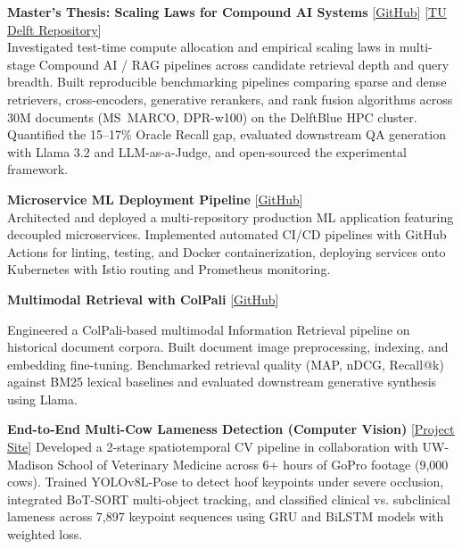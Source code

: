 \documentclass[letterpaper,11pt]{article}
\newcommand{\resumeItem}[1]{
  \item\normalsize{#1}
}
\begin{document}
\resumeItem{\textbf{Master's Thesis: Scaling Laws for Compound AI Systems} [\href{https://github.com/pratham2442000/MasterThesis}{\color{linkblue}\underline{GitHub}}] [\href{https://resolver.tudelft.nl/uuid:f0406b81-8b50-47c9-a44b-5da89c59c916}{\color{linkblue}\underline{TU Delft Repository}}]\\
  Investigated test-time compute allocation and empirical scaling laws in multi-stage Compound AI / RAG pipelines across candidate retrieval depth and query breadth. Built reproducible benchmarking pipelines comparing sparse and dense retrievers, cross-encoders, generative rerankers, and rank fusion algorithms across 30M documents (MS~MARCO, DPR-w100) on the DelftBlue HPC cluster. Quantified the 15--17\% Oracle Recall gap, evaluated downstream QA generation with Llama 3.2 and LLM-as-a-Judge, and open-sourced the experimental framework.}
\vspace{2pt}
\resumeItem{\textbf{Microservice ML Deployment Pipeline} [\href{https://github.com/remla2025-team16}{\color{linkblue}\underline{GitHub}}]\\
  Architected and deployed a multi-repository production ML application featuring decoupled microservices. Implemented automated CI/CD pipelines with GitHub Actions for linting, testing, and Docker containerization, deploying services onto Kubernetes with Istio routing and Prometheus monitoring.}
\vspace{2pt}
\resumeItem{\textbf{Multimodal Retrieval with ColPali} [\href{https://github.com/pratham2442000/dsait4050-ir-project}{\color{linkblue}\underline{GitHub}}]

  Engineered a ColPali-based multimodal Information Retrieval pipeline on historical document corpora. Built document image preprocessing, indexing, and embedding fine-tuning. Benchmarked retrieval quality (MAP, nDCG, Recall@k) against BM25 lexical baselines and evaluated downstream generative synthesis using Llama.}
\vspace{2pt}
\resumeItem{\textbf{End-to-End Multi-Cow Lameness Detection (Computer Vision)} [\href{https://msmink01.github.io/multi-cow-lameness-detection/}{\color{linkblue}\underline{Project Site}}]
  \vspace{2pt}
  Developed a 2-stage spatiotemporal CV pipeline in collaboration with UW-Madison School of Veterinary Medicine across 6+ hours of GoPro footage (9,000 cows). Trained YOLOv8L-Pose to detect hoof keypoints under severe occlusion, integrated BoT-SORT multi-object tracking, and classified clinical vs. subclinical lameness across 7,897 keypoint sequences using GRU and BiLSTM models with weighted loss.}
\end{document}
